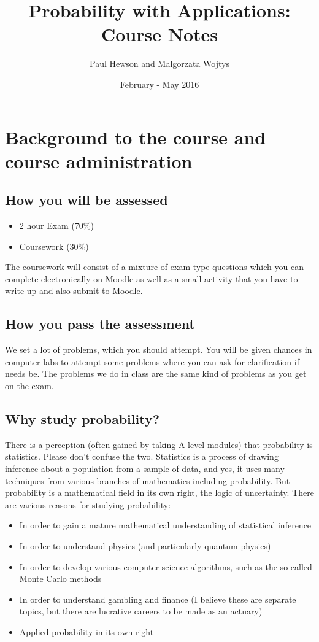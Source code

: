 \documentclass[12pt]{extbook}
\title{Probability with Applications: Course Notes}
\author{Paul Hewson and Malgorzata Wojtys}
\date{February - May 2016}
\begin{document}
\sffamily
\onehalfspacing

\maketitle

\chapter{Background to the course and course administration}

\section{How you will be assessed}

\begin{itemize}
\item 2 hour Exam (70\%)
\item Coursework (30\%)
\end{itemize}

The coursework will consist of a mixture of exam type questions which you can complete electronically on Moodle as well as a small activity that you have to write up and also submit to Moodle.

\section{How you pass the assessment}

We set a lot of problems, which you should attempt.   You will be given chances in computer labs to attempt some problems where you can ask for clarification if needs be.   The problems we do in class are the same kind of problems as you get on the exam.

\section{Why study probability?}

There is a perception (often gained by taking A level modules) that probability is statistics.   Please don't confuse the two.   Statistics is a process of drawing inference about a population from a sample of data, and yes, it uses many techniques from various branches of mathematics including probability.   But probability is a mathematical field in its own right, the logic of uncertainty.   There are various reasons for studying probability:

\begin{itemize}
\item In order to gain a mature mathematical understanding of statistical inference
\item In order to understand physics (and particularly quantum physics)
\item In order to develop various computer science algorithms, such as the so-called Monte Carlo methods
\item In order to understand gambling and finance (I believe these are separate topics, but there are lucrative careers to be made as an actuary)
\item Applied probability in its own right
\end{itemize}
\end{document}
